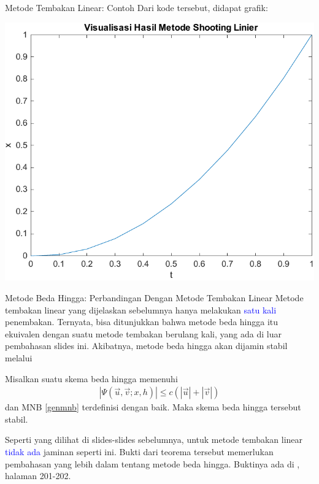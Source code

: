\documentclass[xcolor={dvipsnames}, 9pt]{beamer}
\renewcommand{\emph}[1]{\textcolor{Blue}{#1}}
\begin{document}
	\begin{frame}{Metode Tembakan Linear: Contoh}
		Dari kode tersebut, didapat grafik:
		\begin{center}
			\includegraphics[scale=0.4]{linearshooting.pdf}
		\end{center}
	\end{frame}
	\begin{frame}{Metode Beda Hingga: Perbandingan Dengan Metode Tembakan Linear}
		Metode tembakan linear yang dijelaskan sebelumnya hanya melakukan \emph{satu kali} penembakan. Ternyata, bisa ditunjukkan bahwa metode beda hingga itu ekuivalen dengan suatu metode tembakan berulang kali, yang ada di luar pembahasan slides ini. Akibatnya, metode beda hingga akan dijamin stabil melalui
		\begin{theorem}
			Misalkan suatu skema beda hingga memenuhi
			\begin{align*}
				|\Psi(\vec{u},\vec{v};x,h)| \leq c(|\vec{u}|+|\vec{v}|)
			\end{align*}
			dan MNB \eqref{genmnb} terdefinisi dengan baik. Maka skema beda hingga tersebut stabil.
		\end{theorem}
		Seperti yang dilihat di slides-slides sebelumnya, untuk metode tembakan linear \emph{tidak ada} jaminan seperti ini. \newline
		Bukti dari teorema tersebut memerlukan pembahasan yang lebih dalam tentang metode beda hingga. Buktinya ada di \cite{Ascher1995Numerical}, halaman 201-202.
	\end{frame}
\end{document}
